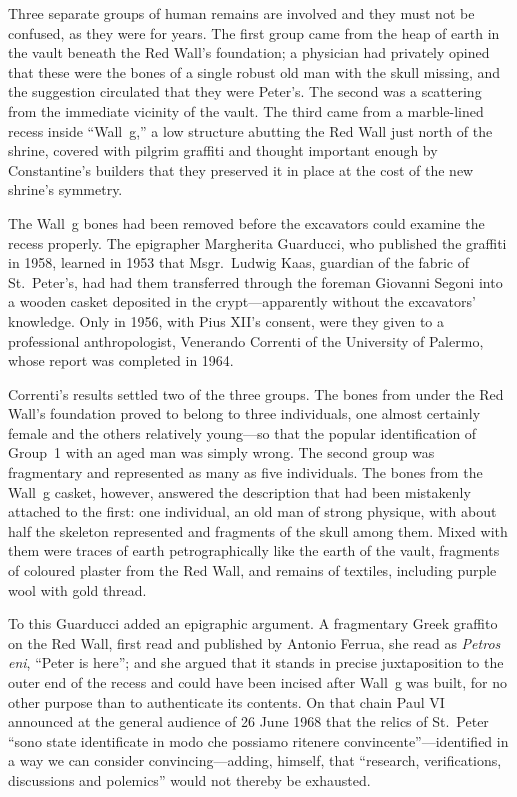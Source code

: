 Three separate groups of human remains are involved and they must not be
confused, as they were for years. The first group came from the heap of earth
in the vault beneath the Red Wall's foundation; a physician had privately
opined that these were the bones of a single robust old man with the skull
missing, and the suggestion circulated that they were Peter's. The second was
a scattering from the immediate vicinity of the vault. The third came from a
marble-lined recess inside ``Wall~g,'' a low structure abutting the Red Wall
just north of the shrine, covered with pilgrim graffiti and thought important
enough by Constantine's builders that they preserved it in place at the cost
of the new shrine's symmetry.

The Wall~g bones had been removed before the excavators could examine the
recess properly. The epigrapher Margherita Guarducci, who published the
graffiti in 1958, learned in 1953 that Msgr.\ Ludwig Kaas, guardian of the
fabric of St.~Peter's, had had them transferred through the foreman Giovanni
Segoni into a wooden casket deposited in the crypt---apparently without the
excavators' knowledge. Only in 1956, with Pius XII's consent, were they given
to a professional anthropologist, Venerando Correnti of the University of
Palermo, whose report was completed in 1964.

Correnti's results settled two of the three groups. The bones from under the
Red Wall's foundation proved to belong to three individuals, one almost
certainly female and the others relatively young---so that the popular
identification of Group~1 with an aged man was simply wrong. The second group
was fragmentary and represented as many as five individuals. The bones from
the Wall~g casket, however, answered the description that had been mistakenly
attached to the first: one individual, an old man of strong physique, with
about half the skeleton represented and fragments of the skull among them.
Mixed with them were traces of earth petrographically like the earth of the
vault, fragments of coloured plaster from the Red Wall, and remains of
textiles, including purple wool with gold thread.

To this Guarducci added an epigraphic argument. A fragmentary Greek graffito
on the Red Wall, first read and published by Antonio Ferrua, she read as
\textit{Petros eni}, ``Peter is here''; and she argued that it stands in
precise juxtaposition to the outer end of the recess and could have been
incised after Wall~g was built, for no other purpose than to authenticate its
contents. On that chain Paul VI announced at the general audience of 26 June
1968 that the relics of St.~Peter ``sono state identificate in modo che
possiamo ritenere convincente''---identified in a way we can consider
convincing---adding, himself, that ``research, verifications, discussions and
polemics'' would not thereby be exhausted.

